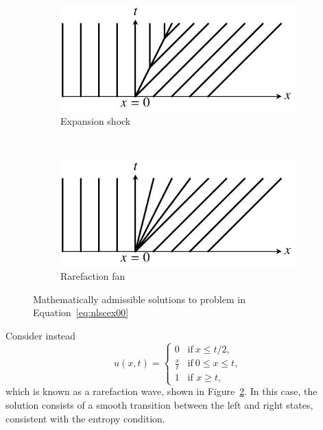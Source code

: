 \begin{figure}[tb]
	\centering
	\begin{subfigure}[b]{0.4\linewidth}
		\includegraphics[width=\linewidth]{Pictures/nonlinear_scalar_entropycond_1}
	\caption{Expansion shock}
	\label{fig:expansionshock}
	\end{subfigure}
	~
	\begin{subfigure}[b]{0.4\linewidth}
		\includegraphics[width=\linewidth]{Pictures/nonlinear_scalar_entropycond_2}
		\caption{Rarefaction fan}
	\label{fig:rarefactionfan}
	\end{subfigure}
	\caption{Mathematically admissible solutions to problem in Equation~\ref{eq:nlscex00}}
	\label{fig:entropycond}
\end{figure}

Consider instead 
\begin{equation}
	u(x,t) = 
	\begin{cases}
		0 & \text{if}~x \leq t/2,\\
		\frac{x}{t} & \text{if}~0 \leq x \leq t, \\
		1 & \text{if } x \geq t,
	\end{cases}
	\label{eq:nlscsol1}
\end{equation}
which is known as a rarefaction wave, shown in Figure~\ref{fig:rarefactionfan}. In this case, the solution consists of a smooth transition between the left and right states, consistent with the entropy condition.

